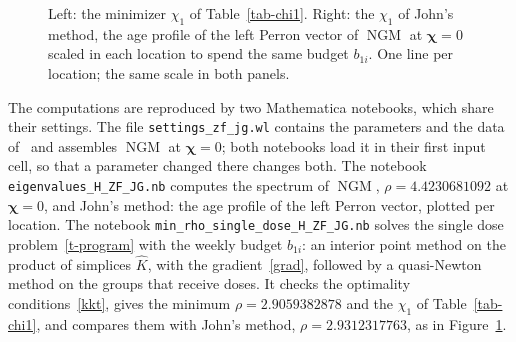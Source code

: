 \documentclass[11pt]{article}
\theoremstyle{plain}
\theoremstyle{definition}
\theoremstyle{remark}
\numberwithin{equation}{section}
\numberwithin{figure}{section}
\numberwithin{table}{section}
\begin{document}
\begin{figure}[ht]
\centering
{}%
\hfill
{}
\caption{Left: the minimizer $\chi_1$ of Table~\ref{tab-chi1}. Right: the
$\chi_1$ of John's method, the age profile of the left Perron vector of
$\operatorname{NGM}$ at $\bm\chi=0$ scaled in each location to spend the same
budget $b_{1i}$. One line per location; the same scale in both
panels.}\label{fig-chi1}
\end{figure}

The computations are reproduced by two Mathematica notebooks, which share
their settings. The file \texttt{settings\_zf\_jg.wl} contains the parameters
and the data of~\cite{JZh} and assembles $\operatorname{NGM}$ at $\bm\chi=0$;
both notebooks load it in their first input cell, so that a parameter changed
there changes both. The notebook \texttt{eigenvalues\_H\_ZF\_JG.nb} computes
the spectrum of $\operatorname{NGM}$, $\rho=4.4230681092$ at $\bm\chi=0$, and
John's method: the age profile of the left Perron vector, plotted per location.
The notebook \texttt{min\_rho\_single\_dose\_H\_ZF\_JG.nb} solves the single
dose problem~\eqref{t-program} with the weekly budget $b_{1i}$: an interior
point method on the product of simplices $\widehat K$, with the gradient~\eqref{grad},
followed by a quasi-Newton method on the groups that receive doses. It checks
the optimality conditions~\eqref{kkt}, gives the minimum $\rho=2.9059382878$ and
the $\chi_1$ of Table~\ref{tab-chi1}, and compares them with John's method,
$\rho=2.9312317763$, as in Figure~\ref{fig-chi1}.
\end{document}
